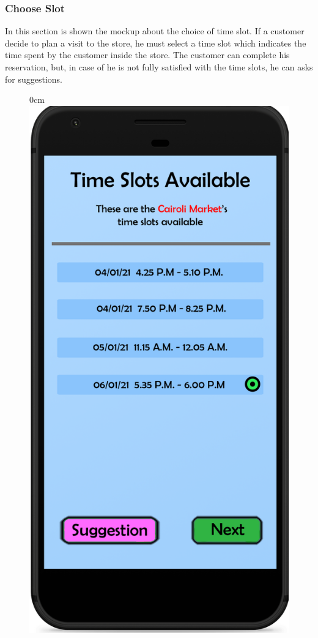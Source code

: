 \documentclass{article}
\begin{document}
		\newpage
		
		\subsubsection{Choose Slot}
		In this section is shown the mockup about the choice of time slot. If a customer decide to plan a visit to the store, he must select a time slot which indicates the time spent by the customer inside the store. The customer can complete his reservation, but, in case of he is not fully satisfied with the time slots, he can asks for suggestions.
		\bigskip
		\bigskip
		\begin{figure}[!h]
 			\begin{adjustwidth} {0cm}{}
				\centering
				\includegraphics[scale=0.2]{../Mockups/TimeSlots.png}\\

\end{adjustwidth}
\end{figure}
\end{document}
